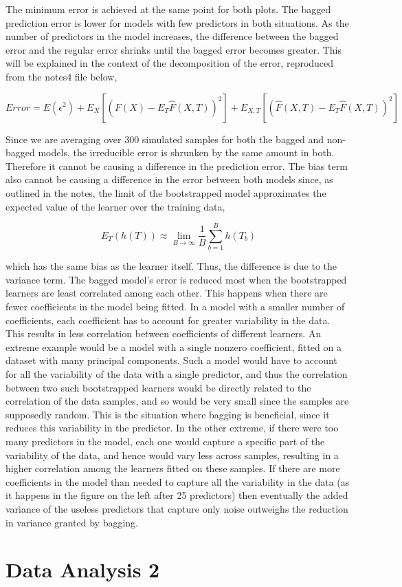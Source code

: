 \documentclass{article}
\begin{document}
The minimum error is achieved at the same point for both plots.
The bagged prediction error is lower for models with few predictors in both situations. As the number of predictors in the model increases, the difference between the bagged error and the regular error shrinks until the bagged error becomes greater. This will be explained in the context of the decomposition of the error, reproduced from the notes4 file below,

\begin{equation*}
Error = E(\epsilon^2) + E_X\left[\left(F(X) - E_T\hat{F}(X,T)\right)^2\right] + E_{X,T}\left[\left(\hat{F}(X, T) - E_T\hat{F}(X,T)\right)^2\right]
\end{equation*}

Since we are averaging over 300 simulated samples for both the bagged and non-bagged models, the irreducible error is shrunken by the same amount in both. Therefore it cannot be causing a difference in the prediction error. The bias term also cannot be causing a difference in the error between both models since, as outlined in the notes, the limit of the bootstrapped model approximates the expected value of the learner over the training data,

\begin{equation*}
E_T(h(T)) \approx \operatorname*{lim}_{B \to \infty} \frac{1}{B}\sum_{b=1}^Bh(T_b)
\end{equation*} 

which has the same bias as the learner itself. Thus, the difference is due to the variance term. The bagged model's error is reduced most when the bootstrapped learners are least correlated among each other. This happens when there are fewer coefficients in the model being fitted. In a model with a smaller number of coefficients, each coefficient has to account for greater variability in the data. This results in less correlation between coefficients of different learners. An extreme example would be a model with a single nonzero coefficient, fitted on a dataset with many principal components. Such a model would have to account for all the variability of the data with a single predictor, and thus the correlation between two such bootstrapped learners would be directly related to the correlation of the data samples, and so would be very small since the samples are supposedly random. This is the situation where bagging is beneficial, since it reduces this variability in the predictor. In the other extreme, if there were too many predictors in the model, each one would capture a specific part of the variability of the data, and hence would vary less across samples, resulting in a higher correlation among the learners fitted on these samples. If there are more coefficients in the model than needed to capture all the variability in the data (as it happens in the figure on the left after 25 predictors) then eventually the added variance of the useless predictors that capture only noise outweighs the reduction in variance granted by bagging.

\section*{Data Analysis 2}
\end{document}
